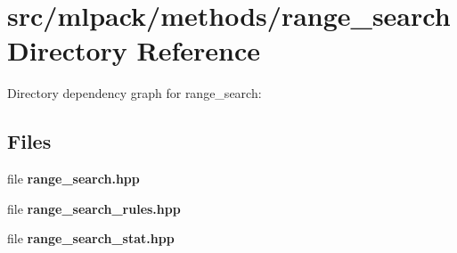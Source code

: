 \section{src/mlpack/methods/range\-\_\-search Directory Reference}
\label{dir_722054202859497df516ebf1a58393de}
Directory dependency graph for range\-\_\-search\-:
\subsection*{Files}
\begin{DoxyCompactItemize}
\item 
file {\bf range\-\_\-search.\-hpp}
\item 
file {\bf range\-\_\-search\-\_\-rules.\-hpp}
\item 
file {\bf range\-\_\-search\-\_\-stat.\-hpp}
\end{DoxyCompactItemize}
